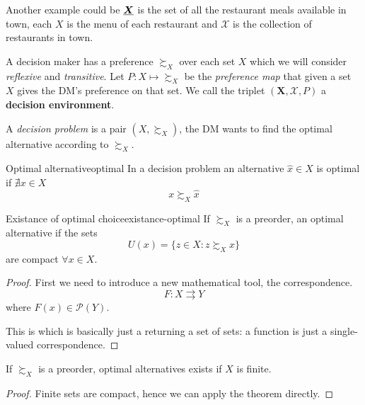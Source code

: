 \documentclass[12pt]{extarticle}
\renewcommand{\vec}[1]{\uvec{#1}}
\begin{document}
Another example could be $\vec X$ is the set of all the restaurant meals available in town, each $X$ is the menu of each restaurant and $\mathcal X$ is the collection of restaurants in town.

A decision maker has a preference $\succsim_X$ over each set $X$
which we will consider \emph{reflexive} and \emph{transitive}.
Let $P: X \mapsto \succsim_X$ be the \emph{preference map} that given a set $X$ gives the DM's preference on that set.
We call the triplet $(\bm X, \mathcal X, P)$ a \textbf{decision environment}.

A \emph{decision problem} is a pair $(X, \succsim_X)$,
the DM wants to find the optimal alternative according to $\succsim_X$.

\begin{definition}{Optimal alternative}{optimal}
	In a decision problem an alternative $\hat x \in X$ is optimal if $\nexists x \in X$
	\begin{equation}
		x \succsim_X \hat  x
	\end{equation}
\end{definition}

\begin{theorem}{Existance of optimal choice}{existance-optimal}
	If $\succsim_X$ is a preorder, an optimal alternative if the sets
	\begin{equation}
		U(x) = \{ z \in X : z \succsim_X x \}
	\end{equation}
	are compact $\forall x \in X$.
\end{theorem}

\begin{proof}
	First we need to introduce a new mathematical tool, the correspondence.
	\begin{equation}
		F:X  \rightrightarrows Y
	\end{equation}
	where $F(x) \in \mathcal P(Y)$.

	This is which is basically just a  returning a set of sets: a function is just a single-valued correspondence.

\end{proof}

\begin{corollary}{}{}
	If $\succsim_X$ is a preorder, optimal alternatives exists if $X$ is finite.
\end{corollary}

\begin{proof}
	Finite sets are compact, hence we can apply the theorem directly.
\end{proof}
\end{document}
